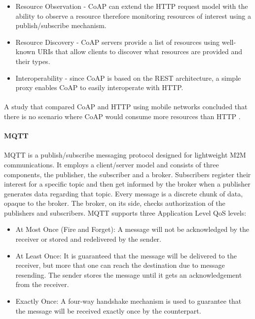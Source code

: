 \begin{itemize}
	\item Resource Observation - \ac{CoAP} can extend the \ac{HTTP} request model with the ability to observe a resource therefore monitoring resources of interest using a publish/subscribe mechanism.\\
	\item Resource Discovery - \ac{CoAP} servers provide a list of resources using well-known {URIs} that allow clients to discover what resources are provided and their types.\\
	\item Interoperability - since \ac{CoAP} is based on the \ac{REST} architecture, a simple proxy enables \ac{CoAP} to easily interoperate with \ac{HTTP}.
\end{itemize}

\paragraph{}
A study that compared \ac{CoAP} and \ac{HTTP} using mobile networks concluded that there is no scenario where \ac{CoAP} would consume more resources than \ac{HTTP} \cite{Savolainen2014}.

\paragraph{\textbf{\ac{MQTT}}}
\paragraph{}
	\ac{MQTT} is a publish/subscribe messaging protocol designed for lightweight \ac{M2M} communications. It employs a client/server model and consists of three components, the publisher, the subscriber and a broker.
Subscribers register their interest for a specific topic and then get informed by the broker when a publisher generates data regarding that topic. Every message is a discrete chunk of data, opaque to the broker. The broker, on its side, checks authorization of the publishers and subscribers. \ac{MQTT} supports three Application Level \ac{QoS} levels:

\begin{itemize}
	\item At Most Once (Fire and Forget): A message will not be acknowledged by the receiver or stored and redelivered by the sender.\\
	\item At Least Once: It is guaranteed that the message will be delivered to the receiver, but more that one can reach the destination due to message resending. The sender stores the message until it gets an acknowledgement from the receiver.\\
	\item Exactly Once: A four-way handshake mechanism is used to guarantee that the message will be received exactly once by the counterpart.
\end{itemize}

